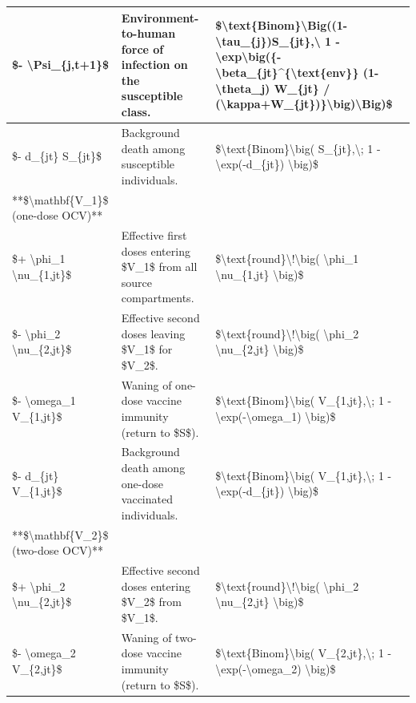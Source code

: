 \documentclass[
]{book}
\begin{document}
\begin{tabular}{l|l|l}
\hline
\$- \textbackslash{}Psi\_\{j,t+1\}\$ & Environment-to-human force of infection on the susceptible class. & \$\textbackslash{}text\{Binom\}\textbackslash{}Big((1-\textbackslash{}tau\_\{j\})S\_\{jt\},\textbackslash{} 1 - \textbackslash{}exp\textbackslash{}big(\{-\textbackslash{}beta\_\{jt\}\textasciicircum{}\{\textbackslash{}text\{env\}\} (1-\textbackslash{}theta\_j) W\_\{jt\} / (\textbackslash{}kappa+W\_\{jt\})\}\textbackslash{}big)\textbackslash{}Big)\$\\
\hline
\$- d\_\{jt\} S\_\{jt\}\$ & Background death among susceptible individuals. & \$\textbackslash{}text\{Binom\}\textbackslash{}big( S\_\{jt\},\textbackslash{}; 1 - \textbackslash{}exp(-d\_\{jt\}) \textbackslash{}big)\$\\
\hline
**\$\textbackslash{}mathbf\{V\_1\}\$ (one-dose OCV)** &  & \\
\hline
\$+ \textbackslash{}phi\_1 \textbackslash{}nu\_\{1,jt\}\$ & Effective first doses entering \$V\_1\$ from all source compartments. & \$\textbackslash{}text\{round\}\textbackslash{}!\textbackslash{}big( \textbackslash{}phi\_1 \textbackslash{}nu\_\{1,jt\} \textbackslash{}big)\$\\
\hline
\$- \textbackslash{}phi\_2 \textbackslash{}nu\_\{2,jt\}\$ & Effective second doses leaving \$V\_1\$ for \$V\_2\$. & \$\textbackslash{}text\{round\}\textbackslash{}!\textbackslash{}big( \textbackslash{}phi\_2 \textbackslash{}nu\_\{2,jt\} \textbackslash{}big)\$\\
\hline
\$- \textbackslash{}omega\_1 V\_\{1,jt\}\$ & Waning of one-dose vaccine immunity (return to \$S\$). & \$\textbackslash{}text\{Binom\}\textbackslash{}big( V\_\{1,jt\},\textbackslash{}; 1 - \textbackslash{}exp(-\textbackslash{}omega\_1) \textbackslash{}big)\$\\
\hline
\$- d\_\{jt\} V\_\{1,jt\}\$ & Background death among one-dose vaccinated individuals. & \$\textbackslash{}text\{Binom\}\textbackslash{}big( V\_\{1,jt\},\textbackslash{}; 1 - \textbackslash{}exp(-d\_\{jt\}) \textbackslash{}big)\$\\
\hline
**\$\textbackslash{}mathbf\{V\_2\}\$ (two-dose OCV)** &  & \\
\hline
\$+ \textbackslash{}phi\_2 \textbackslash{}nu\_\{2,jt\}\$ & Effective second doses entering \$V\_2\$ from \$V\_1\$. & \$\textbackslash{}text\{round\}\textbackslash{}!\textbackslash{}big( \textbackslash{}phi\_2 \textbackslash{}nu\_\{2,jt\} \textbackslash{}big)\$\\
\hline
\$- \textbackslash{}omega\_2 V\_\{2,jt\}\$ & Waning of two-dose vaccine immunity (return to \$S\$). & \$\textbackslash{}text\{Binom\}\textbackslash{}big( V\_\{2,jt\},\textbackslash{}; 1 - \textbackslash{}exp(-\textbackslash{}omega\_2) \textbackslash{}big)\$\\

\end{tabular}
\end{document}
